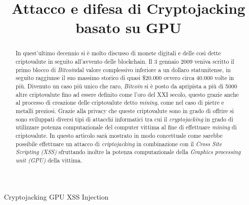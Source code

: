 \documentclass[conference, italian]{IEEEtran}
\begin{document}
\title{Attacco e difesa di Cryptojacking basato su GPU
}

\author{
\and
{}
}

\maketitle

\begin{abstract}
In quest'ultimo decennio si è molto discusso di monete digitali e delle così dette criptovalute in seguito all'avvento delle blockchain. Il 3 gennaio 2009 veniva scritto il primo blocco di \emph{Bitcoin}dal valore complessivo inferiore a un dollaro statunitense, in seguito raggiunse il suo massimo storico di quasi \$20.000 ovvero circa 40.000 volte in più. Divenuto un caso più unico che raro, \emph{Bitcoin} si è posto da apripista a più di 5000 altre criptovalute fino ad essere definito come l'oro del \RN{21} secolo, questo grazie anche al processo di creazione delle criptovalute detto \emph{mining}, come nel caso di pietre e metalli preziosi. Grazie alla privacy che queste criptovalute sono in grado di offrire si sono sviluppati diversi tipi di attacchi informatici tra cui il \emph{cryptojacking} in grado di utilizzare potenza computazionale del computer vittima al fine di effettuare \emph{mining} di criptovalute. In questo articolo sarà mostrato in modo concettuale come sarebbe possibile effettuare un attacco di \emph{criptojacking} in combinazione con il \emph{Cross Site Scripting (XSS)} sfruttando inoltre la potenza computazionale della \emph{Graphics processing unit (GPU)} della vittima. \\
\end{abstract}

\begin{IEEEkeywords}
Cryptojacking GPU XSS Injection
\end{IEEEkeywords}
\end{document}
